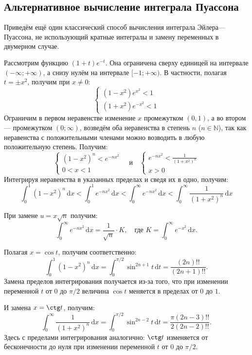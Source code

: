\documentclass[coursework, och, times]{SCWorks1}
\newcommand{\N}{\mathbb{N}}
\newcommand{\dd}{\,\mathrm{d}}
\begin{document}
\subsection{Альтернативное вычисление интеграла Пуассона}
\label{sec:poisson-alt}

Приведём ещё один классический способ вычисления интеграла Эйлера—Пуассона, не использующий кратные интегралы и замену переменных в двумерном случае.

Рассмотрим функцию \((1+t)e^{-t}\). Она ограничена сверху единицей на интервале \((-\infty; +\infty)\), а снизу нулём на интервале \([-1; +\infty)\). В частности, полагая \(t = \pm x^2\), получим при \(x \neq 0\):
\[
\begin{cases}
(1 - x^2)e^{x^2} < 1 \\
(1 + x^2)e^{-x^2} < 1
\end{cases}
\]
Ограничим в первом неравенстве изменение \(x\) промежутком \((0, 1)\), а во втором — промежутком \((0; \infty)\), возведём оба неравенства в степень \(n\) (\(n \in \N\)), так как неравенства с положительными членами можно возводить в любую положительную степень. Получим:
\[
\begin{cases}
(1 - x^2)^n < e^{-nx^2} \\
0 < x < 1
\end{cases}
\quad \text{и} \quad
\begin{cases}
e^{-nx^2} < \frac{1}{(1+x^2)^n} \\
x > 0
\end{cases}
\]
Интегрируя неравенства в указанных пределах и сведя их в одно, получим:
\[
\int_0^1 (1 - x^2)^n \dd x < \int_0^1 e^{-nx^2} \dd x < \int_0^\infty e^{-nx^2} \dd x < \int_0^\infty \frac{1}{(1 + x^2)^n} \dd x
\]

При замене \(u = x\sqrt{n}\) получим:
\[
\int_0^\infty e^{-nx^2} \dd x = \frac{1}{\sqrt{n}} \cdot K, \quad \text{где } K = \int_0^\infty e^{-x^2} \dd x.
\]

Полагая \(x = \cos t\), получим соответственно:
\[
\int_0^1 (1 - x^2)^n \dd x = \int_0^{\pi/2} \sin^{2n+1} t \dd t = \frac{(2n)!!}{(2n+1)!!}.
\]
Замена пределов интегрирования получается из-за того, что при изменении переменной \(t\) от \(0\) до \(\pi/2\) величина \(\cos t\) меняется в пределах от \(0\) до \(1\).

И замена \(x = \ctg t\), получим:
\[
\int_0^\infty \frac{1}{(1 + x^2)^n} \dd x = \int_0^{\pi/2} \sin^{2n-2} t \dd t = \frac{\pi(2n - 3)!!}{2(2n - 2)!!}.
\]
Здесь с пределами интегрирования аналогично: \(\ctg t\) изменяется от бесконечности до нуля при изменении переменной \(t\) от \(0\) до \(\pi/2\).
\end{document}
